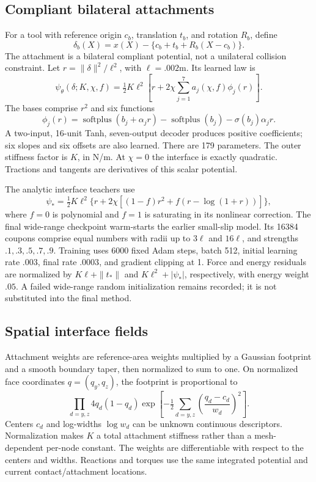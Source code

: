 \documentclass[10pt,twocolumn,letterpaper]{article}
\newcommand{\spn}{\operatorname{softplus}}
\begin{document}
\subsection{Compliant bilateral attachments}
For a tool with reference origin $c_b$, translation $t_b$, and rotation $R_b$, define
\begin{equation}
 \delta_b(X)=x(X)-\{c_b+t_b+R_b(X-c_b)\}.
\end{equation}
The attachment is a bilateral compliant potential, not a unilateral collision constraint. Let $r=\|\delta\|^2/\ell^2$, with $\ell=.002$m. Its learned law is
\begin{equation}
 \psi_\theta(\delta;K,\chi,f)=\tfrac12K\ell^2\left[r+2\chi\sum_{j=1}^{7}a_j(\chi,f)\phi_j(r)\right].
\end{equation}
The bases comprise $r^2$ and six functions
\begin{equation}
 \phi_j(r)=\spn(b_j+\alpha_jr)-\spn(b_j)-\sigma(b_j)\alpha_jr.
\end{equation}
A two-input, 16-unit Tanh, seven-output decoder produces positive coefficients; six slopes and six offsets are also learned. There are 179 parameters. The outer stiffness factor is $K$, in N/m. At $\chi=0$ the interface is exactly quadratic. Tractions and tangents are derivatives of this scalar potential.

The analytic interface teachers use
\begin{equation}
 \psi_* =\tfrac12K\ell^2\{r+2\chi[(1-f)r^2+f(r-\log(1+r))]\},
\end{equation}
where $f=0$ is polynomial and $f=1$ is saturating in its nonlinear correction. The final wide-range checkpoint warm-starts the earlier small-slip model. Its 16384 coupons comprise equal numbers with radii up to $3\ell$ and $16\ell$, and strengths $.1,.3,.5,.7,.9$. Training uses 6000 fixed Adam steps, batch 512, initial learning rate $.003$, final rate $.0003$, and gradient clipping at 1. Force and energy residuals are normalized by $K\ell+\|t_*\|$ and $K\ell^2+|\psi_*|$, respectively, with energy weight $.05$. A failed wide-range random initialization remains recorded; it is not substituted into the final method.

\subsection{Spatial interface fields}
Attachment weights are reference-area weights multiplied by a Gaussian footprint and a smooth boundary taper, then normalized to sum to one. On normalized face coordinates $q=(q_y,q_z)$, the footprint is proportional to
\begin{equation}
 \prod_{d=y,z}4q_d(1-q_d)\exp\left[-\tfrac12\sum_{d=y,z}\left(\frac{q_d-c_d}{w_d}\right)^2\right].
\end{equation}
Centers $c_d$ and log-widths $\log w_d$ can be unknown continuous descriptors. Normalization makes $K$ a total attachment stiffness rather than a mesh-dependent per-node constant. The weights are differentiable with respect to the centers and widths. Reactions and torques use the same integrated potential and current contact/attachment locations.
\end{document}
